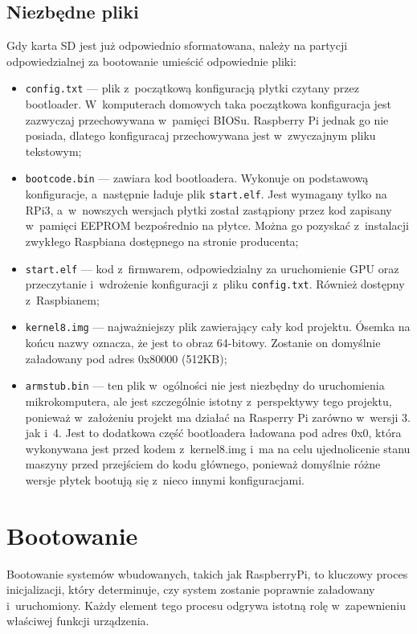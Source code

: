 \documentclass[shortabstract]{iithesis}
\begin{document}
\subsection{Niezbędne pliki}
Gdy karta SD jest już odpowiednio sformatowana, należy na partycji odpowiedzialnej za bootowanie umieścić odpowiednie pliki:
\begin{itemize}
 \item \texttt{config.txt}  --- plik z~początkową konfiguracją płytki czytany przez bootloader. W~komputerach domowych taka początkowa konfiguracja jest zazwyczaj przechowywana w~pamięci BIOSu. Raspberry Pi jednak go nie posiada, dlatego konfiguracaj przechowywana jest w~zwyczajnym pliku tekstowym;
 \item \texttt{bootcode.bin}  --- zawiara kod bootloadera. Wykonuje on podstawową konfiguracje, a~następnie ładuje plik \texttt{start.elf}. Jest wymagany tylko na RPi3, a~w~nowszych wersjach płytki został zastąpiony przez kod zapisany w~pamięci EEPROM bezpośrednio na płytce. Można go pozyskać z~instalacji zwykłego Raspbiana dostępnego na stronie producenta;
 \item \texttt{start.elf}  --- kod z~firmwarem, odpowiedzialny za uruchomienie GPU oraz przeczytanie i~wdrożenie konfiguracji z~pliku \texttt{config.txt}. Również dostępny z~Raspbianem;
 \item \texttt{kernel8.img}  --- najważniejszy plik zawierający cały kod projektu. Ósemka na końcu nazwy oznacza, że jest to obraz 64-bitowy. Zostanie on domyślnie załadowany pod adres 0x80000 (512KB);
 \item \texttt{armstub.bin}  --- ten plik w~ogólności nie jest niezbędny do uruchomienia mikrokomputera, ale jest szczególnie istotny z~perspektywy tego projektu, ponieważ w~założeniu projekt ma działać na Rasperry Pi zarówno w~wersji 3. jak i~4. Jest to dodatkowa część bootloadera ładowana pod adres 0x0, która wykonywana jest przed kodem z~kernel8.img i~ma na celu ujednolicenie stanu maszyny przed przejściem do kodu głównego, ponieważ domyślnie różne wersje płytek bootują się z~nieco innymi konfiguracjami.
\end{itemize}

\section{Bootowanie}
Bootowanie systemów wbudowanych, takich jak RaspberryPi, to kluczowy proces inicjalizacji, który determinuje, czy system zostanie poprawnie załadowany i~uruchomiony. Każdy element tego procesu odgrywa istotną rolę w~zapewnieniu właściwej funkcji urządzenia.
\end{document}
